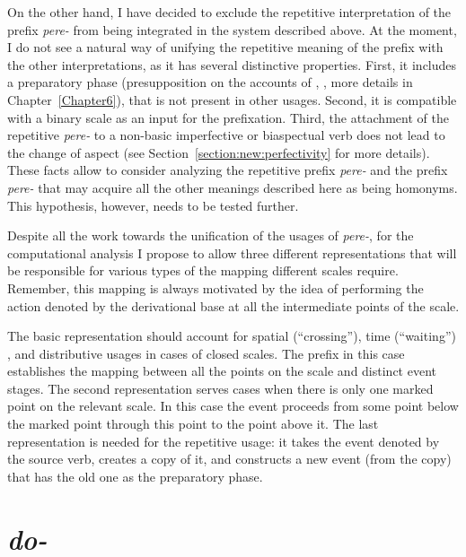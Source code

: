 On the other hand, I have decided to exclude the repetitive interpretation of the prefix \textit{pere-} from being integrated in the system described above. At the moment, I do not see a natural way of unifying the repetitive meaning of the prefix with the other interpretations, as it has several distinctive properties. First, it includes a preparatory phase (presupposition on the accounts of \citealt{Demjjanow:97}, \citealt{Kagan:book}, more details in Chapter~\ref{Chapter6}), that is not present in other usages. Second, it is compatible with a binary scale as an input for the prefixation. Third, the attachment of the repetitive \textit{pere-} to a non-basic imperfective or biaspectual verb does not lead to the change of aspect (see Section~\ref{section:new:perfectivity} for more details). These facts allow to consider analyzing the repetitive prefix \textit{pere-} and the prefix \textit{pere-} that may acquire all the other meanings described here as being homonyms. This hypothesis, however, needs to be tested further.

Despite all the work towards the unification of the usages of \textit{pere-}, for the computational analysis I propose to allow three different representations that will be responsible for various types of the mapping different scales require. Remember, this mapping is always motivated by the idea of performing the action denoted by the derivational base at all the intermediate points of the scale. 

The basic representation should account for spatial (``crossing''), time (``waiting'') , and distributive usages in cases of closed scales. The prefix in this case establishes the mapping between all the points on the scale and distinct event stages. The second representation serves cases when there is only one marked point on the relevant scale. In this case the event proceeds from some point below the marked point through this point to the point above it. The last representation is needed for the repetitive usage: it takes the event denoted by the source verb, creates a copy of it, and constructs a new event (from the copy) that has the old one as the preparatory phase.

\section{\textit{do-}}\label{subsection:semantics:do}
